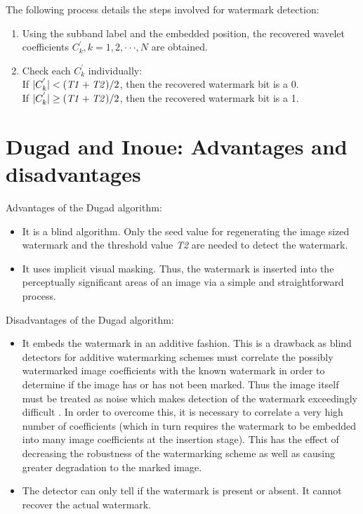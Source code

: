 \documentclass[12pt]{report}
\begin{document}
The following process details the steps involved for watermark detection:
\begin{enumerate}
	\item Using the subband label and the embedded position, the
	recovered wavelet coefficients $C_{k}^{'}, k = 1,2,\cdot\cdot\cdot, N$ are obtained.

	\item Check each $C_{k}^{'}$ individually: \\
	If $|C_{k}^{'}| < (\mbox{\emph{T1}} + \mbox{\emph{T2}}) / 2$, then the
	recovered watermark bit is a 0. \\
	If $|C_{k}^{'}| \geq (\mbox{\emph{T1}} + \mbox{\emph{T2}}) / 2$, then the
	recovered watermark bit is a 1. 
\end{enumerate}

\section{Dugad and Inoue: Advantages and disadvantages}
Advantages of the Dugad algorithm:
\begin{itemize}
	\item It is a blind algorithm. Only the seed value for regenerating the 
	image sized watermark and
	the threshold value \emph{T2} are needed to detect the watermark.
	\item It uses implicit visual masking. Thus, the watermark is inserted
	into the perceptually significant areas of an image via a simple
	and straightforward process.
\end{itemize}
Disadvantages of the Dugad algorithm:
\begin{itemize}
	\item It embeds the watermark in an additive fashion.
	This is a drawback as blind detectors for additive watermarking schemes must correlate the
	possibly watermarked image coefficients with the known
	watermark in order to determine if the image has or has not 
	been marked. Thus the image itself must be treated as noise 
	which makes detection of the watermark exceedingly difficult \cite{meerMasters}.
	In order to overcome this, it is necessary to correlate a very high number
	of coefficients (which in turn requires the watermark to be embedded into many
	image coefficients at the insertion stage). This has the effect of decreasing
	the robustness of the watermarking scheme as well as causing greater degradation
	to the marked image.
	\item The detector can only tell if the watermark is
	present or absent. It cannot recover the actual watermark.
\end{itemize}
\end{document}
